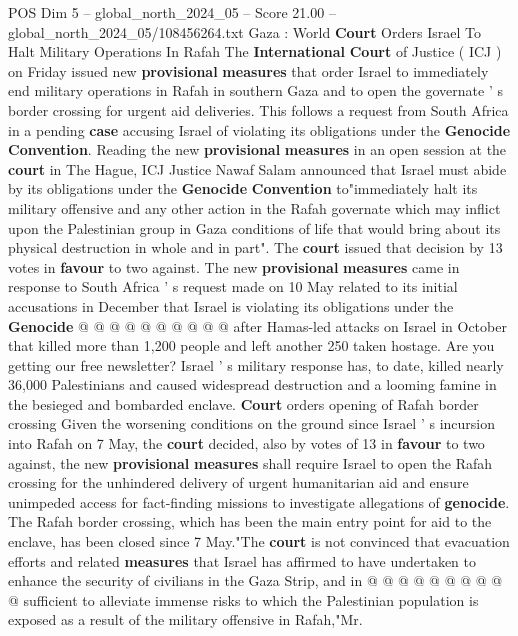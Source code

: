 \begin{textsample}{POS Dim 5 – global\_north\_2024\_05 – Score 21.00 – global\_north\_2024\_05/108456264.txt}  \label{ex:f5_pos_163}
Gaza : World \textbf{Court} Orders Israel To Halt Military Operations In Rafah The \textbf{International} \textbf{Court} of Justice ( ICJ ) on Friday issued new \textbf{provisional} \textbf{measures} that order Israel to immediately end military operations in Rafah in southern Gaza and to open the governate ' s border crossing for urgent aid deliveries.
This follows a request from South Africa in a pending \textbf{case} accusing Israel of violating its obligations under the \textbf{Genocide} \textbf{Convention}.
Reading the new \textbf{provisional} \textbf{measures} in an open session at the \textbf{court} in The Hague, ICJ Justice Nawaf Salam announced that Israel must abide by its obligations under the \textbf{Genocide} \textbf{Convention} to"immediately halt its military offensive and any other action in the Rafah governate which may inflict upon the Palestinian group in Gaza conditions of life that would bring about its physical destruction in whole and in part".
The \textbf{court} issued that decision by 13 votes in \textbf{favour} to two against.
The new \textbf{provisional} \textbf{measures} came in response to South Africa ' s request made on 10 May related to its initial accusations in December that Israel is violating its obligations under the \textbf{Genocide} @ @ @ @ @ @ @ @ @ @ after Hamas-led attacks on Israel in October that killed more than 1,200 people and left another 250 taken hostage.
Are you getting our free newsletter?
Israel ' s military response has, to date, killed nearly 36,000 Palestinians and caused widespread destruction and a looming famine in the besieged and bombarded enclave. \textbf{Court} orders opening of Rafah border crossing Given the worsening conditions on the ground since Israel ' s incursion into Rafah on 7 May, the \textbf{court} decided, also by votes of 13 in \textbf{favour} to two against, the new \textbf{provisional} \textbf{measures} shall require Israel to open the Rafah crossing for the unhindered delivery of urgent humanitarian aid and ensure unimpeded access for fact-finding missions to investigate allegations of \textbf{genocide}.
The Rafah border crossing, which has been the main entry point for aid to the enclave, has been closed since 7 May."The \textbf{court} is not convinced that evacuation efforts and related \textbf{measures} that Israel has affirmed to have undertaken to enhance the security of civilians in the Gaza Strip, and in @ @ @ @ @ @ @ @ @ @ sufficient to alleviate immense risks to which the Palestinian population is exposed as a result of the military offensive in Rafah,"Mr.

\end{textsample}
